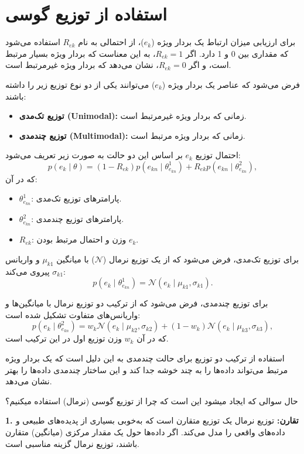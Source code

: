 \documentclass[a4paper,12pt,openany]{report}
\begin{document}
\section{استفاده از توزیع گوسی}

برای ارزیابی میزان ارتباط یک بردار ویژه (\(e_k\))، از احتمالی به نام \(R_{ek}\) استفاده می‌شود که مقداری بین 0 و 1 دارد. اگر \(R_{ek} = 1\)، به این معناست که بردار ویژه بسیار مرتبط است، و اگر \(R_{ek} = 0\)، نشان می‌دهد که بردار ویژه غیرمرتبط است.

فرض می‌شود که عناصر یک بردار ویژه (\(e_k\)) می‌توانند یکی از دو نوع توزیع زیر را داشته باشند:
\begin{itemize}
	\item \textbf{توزیع تک‌مدی (Unimodal):} زمانی که بردار ویژه غیرمرتبط است.
	\item \textbf{توزیع چندمدی (Multimodal):} زمانی که بردار ویژه مرتبط است.
\end{itemize}

احتمال توزیع \(e_k\) بر اساس این دو حالت به صورت زیر تعریف می‌شود:
\[
p(e_k \mid \theta) = (1 - R_{ek})  p(e_{kn} \mid \theta_{e_{kn}}^1) + R_{ek}  p(e_{kn} \mid \theta_{e_{kn}}^2),
\]
که در آن:
\begin{itemize}
	\item \(\theta_{e_{kn}}^1\): پارامترهای توزیع تک‌مدی.
	\item \(\theta_{e_{kn}}^2\): پارامترهای توزیع چندمدی.
	\item \(R_{ek}\): وزن و احتمال مرتبط بودن \(e_k\).
\end{itemize}

برای توزیع تک‌مدی، فرض می‌شود که از یک توزیع نرمال (\(\mathcal{N}\)) با میانگین \(\mu_{k1}\) و واریانس \(\sigma_{k1}\) پیروی می‌کند:
\[
p(e_k \mid \theta_{e_{kn}}^1) = \mathcal{N}(e_k \mid \mu_{k1}, \sigma_{k1}).
\]

برای توزیع چندمدی، فرض می‌شود که از ترکیب دو توزیع نرمال با میانگین‌ها و واریانس‌های متفاوت تشکیل شده است:
\[
p(e_k \mid \theta_{e_{kn}}^2) = w_k \mathcal{N}(e_k \mid \mu_{k2}, \sigma_{k2}) + (1 - w_k) \mathcal{N}(e_k \mid \mu_{k3}, \sigma_{k3}),
\]
که در آن \(w_k\) وزن توزیع اول در این ترکیب است.

استفاده از ترکیب دو توزیع برای حالت چندمدی به این دلیل است که یک بردار ویژه مرتبط می‌تواند داده‌ها را به چند خوشه جدا کند و این ساختار چندمدی داده‌ها را بهتر نشان می‌دهد.

حال سوالی که ایجاد میشود این است که چرا از توزیع گوسی (نرمال) استفاده میکنیم؟

\textbf{1. تقارن:}  
توزیع نرمال یک توزیع متقارن است که به‌خوبی بسیاری از پدیده‌های طبیعی و داده‌های واقعی را مدل می‌کند. اگر داده‌ها حول یک مقدار مرکزی (میانگین) متقارن باشند، توزیع نرمال گزینه مناسبی است.
\end{document}
